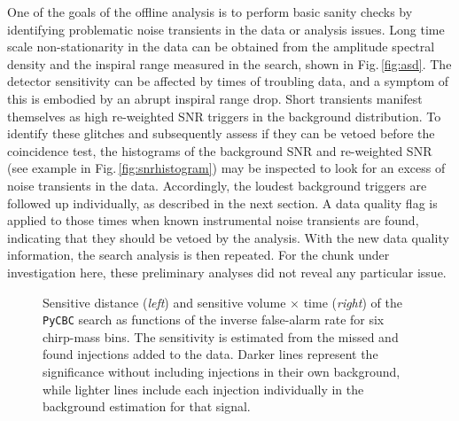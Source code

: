 \documentclass[binding=0.6cm, LaM]{sapthesis}
\begin{document}
	One of the goals of the offline analysis is to perform basic sanity checks 
	by identifying problematic noise transients in the data or analysis issues.
	Long time scale non-stationarity in the data can be obtained from the amplitude spectral density 
	and the inspiral range measured in the search, shown in Fig.\,\ref{fig:asd}.
	The detector sensitivity can be affected by times of troubling data, 
	and a symptom of this is embodied  by  an abrupt inspiral range drop.
	Short transients manifest themselves as high re-weighted SNR triggers in the background distribution. 
	To identify these glitches and subsequently  assess if they can be vetoed before the coincidence test, 
	the histograms of the background SNR and re-weighted SNR (see example in Fig.\,\ref{fig:snrhistogram}) 
	may be inspected to look for an excess of noise transients in the data.
	Accordingly, the loudest background triggers are followed up individually, 
	as described in the next section.
	A data quality flag is applied to those times when known instrumental noise transients are found, 
	indicating that they should be vetoed by the analysis. 
	With the new data quality information, the search analysis is then repeated.  
        For the chunk under investigation here, these preliminary analyses did not reveal any particular issue.

        \begin{figure}[t]
          \noindent
          \label{sens_vt}
          \centering
          \caption{Sensitive distance (\textit{left}) and sensitive volume $\times$ time (\textit{right}) of the {\texttt{PyCBC}} search as functions of the inverse false-alarm rate for six chirp-mass bins. The sensitivity is estimated from the missed and found injections added to the data. Darker lines represent the significance without including injections in their own background, while lighter lines include each injection individually in the background estimation for that signal.}
          \label{fig:sens_vt}
        \end{figure}
\end{document}
